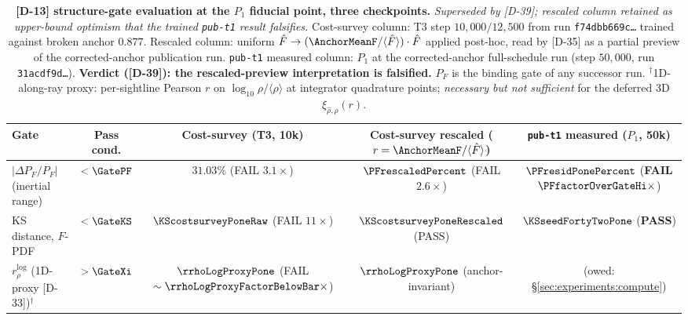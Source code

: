 \begin{table}[t]
    \centering
    \renewcommand{\arraystretch}{1.15}
    \setlength{\tabcolsep}{3pt}
    \footnotesize
    \begin{tabular}{l|c|c|c|c}
    Gate & Pass cond. & Cost-survey (T3, 10k) & Cost-survey rescaled ($r=\AnchorMeanF/\langle\hat F\rangle$) & \texttt{pub-t1} measured ($P_1$, 50k) \\
    \hline
    $|\Delta P_F/P_F|$ (inertial range) & $< \GatePF$ & $31.03\%$ (FAIL $3.1\times$) & $\PFrescaledPercent$ (FAIL $2.6\times$) & $\mathbf{\PFresidPonePercent}$ (\textbf{FAIL} $\mathbf{\PFfactorOverGateHi\times}$) \\
    KS distance, $F$-PDF & $< \GateKS$ & $\KScostsurveyPoneRaw$ (FAIL $11\times$) & $\mathbf{\KScostsurveyPoneRescaled}$ (PASS) & $\mathbf{\KSseedFortyTwoPone}$ (\textbf{PASS}) \\
    $r_\rho^{\log}$ (1D-proxy [D-33])$^\dagger$ & $> \GateXi$ & $\rrhoLogProxyPone$ (FAIL $\sim \rrhoLogProxyFactorBelowBar\times$) & $\rrhoLogProxyPone$ (anchor-invariant) & (owed: \S\ref{sec:experiments:compute}) \\
    \end{tabular}
    \caption{\textbf{[D-13] structure-gate evaluation at the $P_1$ fiducial point, three checkpoints.} \emph{Superseded by [D-39]; rescaled column retained as upper-bound optimism that the trained \texttt{pub-t1} result falsifies.} Cost-survey column: T3 step $10{,}000/12{,}500$ from run \texttt{f74dbb669c\dots} trained against broken anchor $0.877$. Rescaled column: uniform $\hat{F} \to (\AnchorMeanF/\langle\hat{F}\rangle)\cdot\hat{F}$ applied post-hoc, read by [D-35] as a partial preview of the corrected-anchor publication run. \texttt{pub-t1} measured column: $P_1$ at the corrected-anchor full-schedule run (step $50{,}000$, run \texttt{31acdf9d\dots}). \textbf{Verdict ([D-39]): the rescaled-preview interpretation is falsified.} $P_F$ is the binding gate of any successor run. $^\dagger$1D-along-ray proxy: per-sightline Pearson $r$ on $\log_{10}\rho/\langle\rho\rangle$ at integrator quadrature points; \emph{necessary but not sufficient} for the deferred 3D $\xi_{\hat\rho,\rho}(r)$.}
    \label{tab:d13-gates}
\end{table}

